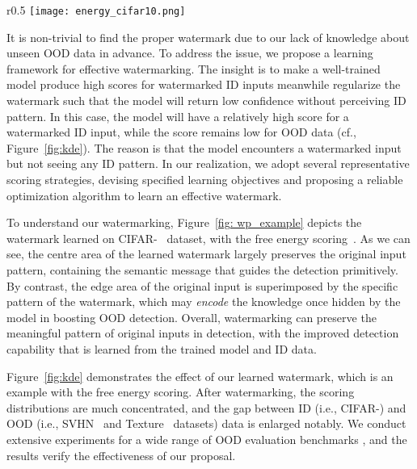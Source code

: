 \documentclass{article}
\begin{document}
\begin{wrapfigure}{r}{0.5\textwidth}
    \centering
    \texttt{[image: energy\_cifar10.png]}
\vspace{1.5pt}
    \caption{Watermarking on CIFAR-~\cite{krizhevsky2009learning} with free energy scoring~\cite{liu2020energy}. The left figure is the learned watermark; the middle figure is an original input; the right figure is the watermarked result.} \label{fig: wp_example}
\end{wrapfigure}

It is non-trivial to find the proper watermark due to our lack of knowledge about unseen OOD data in advance. To address the issue, we propose a learning framework for effective watermarking. The insight is to make a well-trained model produce high scores for watermarked ID inputs meanwhile regularize the watermark such that the model will return low confidence without perceiving ID pattern. In this case, the model will have a relatively high score for a watermarked ID input, while the score remains low for OOD data (cf., Figure~\ref{fig:kde}). The reason is that the model encounters a watermarked input but not seeing any ID pattern. In our realization, we adopt several representative scoring strategies, devising specified learning objectives and proposing a reliable optimization algorithm to learn an effective watermark. 





To understand our watermarking, Figure~\ref{fig: wp_example} depicts the watermark learned on CIFAR-~\cite{krizhevsky2009learning} dataset, with the free energy scoring~\cite{liu2020energy}. As we can see, the centre area of the learned watermark largely preserves the original input pattern, containing the semantic message that guides the detection primitively. By contrast, the edge area of the original input is superimposed by the specific pattern of the watermark, which may \emph{encode} the knowledge once hidden by the model in boosting OOD detection. Overall, watermarking can preserve the meaningful pattern of original inputs in detection, with the improved detection capability that is learned from the trained model and ID data. 



Figure~\ref{fig:kde} demonstrates the effect of our learned watermark, which is an example with the free energy scoring. After watermarking, the scoring distributions are much concentrated, and the gap between ID (i.e., CIFAR-) and OOD (i.e., SVHN~\cite{netzer2011reading} and Texture~\cite{cimpoi2014describing} datasets) data is enlarged notably. We conduct extensive experiments for a wide range of OOD evaluation benchmarks 
, and the results verify the effectiveness of our proposal. 
\end{document}

